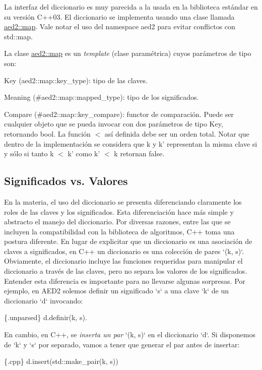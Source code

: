 \-La interfaz del diccionario es muy parecida a la usada en la biblioteca estándar en su versión \-C++03. \-El diccionario se implementa usando una clase llamada \hyperlink{classaed2_1_1map}{aed2\-::map}. \-Vale notar el uso del namespace aed2 para evitar conflictos con std\-::map.

\-La clase \hyperlink{classaed2_1_1map}{aed2\-::map} es un {\itshape template\/} (clase paramétrica) cuyos parámetros de tipo son\-:
\begin{DoxyItemize}
\item \-Key (aed2\-::map\-::key\-\_\-type)\-: tipo de las claves.
\item \-Meaning (\#aed2\-::map\-::mapped\-\_\-type)\-: tipo de los significados.
\item \-Compare (\#aed2\-::map\-::key\-\_\-compare)\-: functor de comparación. \-Puede ser cualquier objeto que se pueda invocar con dos parámetros de tipo \-Key, retornando {\ttfamily bool}. \-La función $<$ así definida debe ser un orden total. \-Notar que dentro de la implementación se considera que {\ttfamily k} y {\ttfamily k'} representan la misma clave si y sólo si tanto {\ttfamily k} $<$ {\ttfamily k'} como {\ttfamily k'} $<$ {\ttfamily k} retornan {\ttfamily false}.
\end{DoxyItemize}\hypertarget{Interfaz_Diferencias}{}\subsection{\-Significados vs. Valores}\label{Interfaz_Diferencias}
\-En la materia, el uso del diccionario se presenta diferenciando claramente los roles de las claves y los significados. \-Esta diferenciación hace más simple y abstracto el manejo del diccionario. \-Por diversas razones, entre las que se incluyen la compatibilidad con la biblioteca de algoritmos, \-C++ toma una postura diferente. \-En lugar de explicitar que un diccionario es una asociación de claves a significados, en \-C++ un diccionario es una colección de pares `(k, s)`. \-Obviamente, el diccionario incluye las funciones requeridas para manipular el diccionario a través de las claves, pero no separa los valores de los significados. \-Entender esta diferencia es importante para no llevarse algunas sorpresas. \-Por ejemplo, en \-A\-E\-D2 solemos definir un significado `s` a una clave `k` de un diccionario `d` invocando\-: 
\begin{DoxyCode}
 \{.unparsed\}
 d.definir(k, s).
\end{DoxyCode}
 \-En cambio, en \-C++, se {\itshape inserta un par\/} `(k, s)` en el diccionario `d`. \-Si disponemos de `k` y `s` por separado, vamos a tener que generar el par antes de insertar\-: 
\begin{DoxyCode}
 \{.cpp\}
 d.insert(std::make\_pair(k, s))
\end{DoxyCode}


